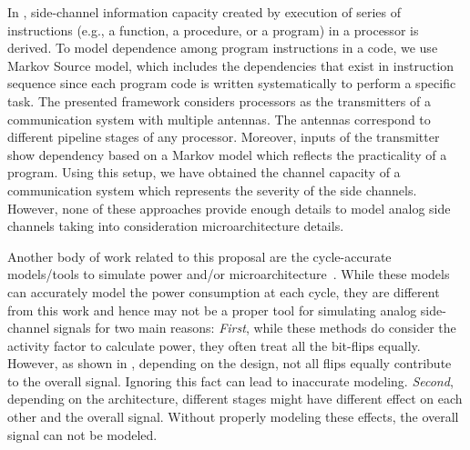 \documentclass[11 pt]{article}
\begin{document}
In \cite{Baki_2020a}, side-channel information capacity created by execution of series of instructions (e.g., a function, a procedure, or a program) in a processor is derived. To model dependence among program instructions in a code, we use Markov Source model, which includes the dependencies that exist in instruction sequence since each program code is written systematically to perform a specific task. The presented  framework  considers processors as the transmitters of a communication system with multiple antennas. The antennas correspond to different pipeline stages of any processor. Moreover, inputs of the transmitter show dependency based on a Markov model which reflects the practicality of a program. Using this setup, we have obtained the channel capacity of a communication system which represents the severity of the side channels. However, none of these approaches provide enough details to model analog side channels taking into consideration microarchitecture details.

Another body of work related to this proposal are the cycle-accurate models/tools to simulate power and/or microarchitecture~\cite{Li:2009:MIP:1669112.1669172,Li:2011:CAM:2132325.2132479,509850,Ardestani:2013:EFM:2495252.2495480,Binkert:2011:GS:2024716.2024718,sesc,5982026,carlson2014aeohmcm}. While these models can accurately model the power consumption at each cycle, they are different from this work and hence may not be a proper tool for simulating analog side-channel signals for two main reasons: \textit{First}, while these methods do consider the activity factor to calculate power, they often treat all the bit-flips equally. However, as shown in \cite{Nader2020}, depending on the design, not all flips equally contribute to the overall signal. Ignoring this fact can lead to inaccurate modeling. \textit{Second}, depending on the architecture, different stages might have different effect on each other and the overall signal. Without properly modeling these effects, the overall signal can not be modeled.
\end{document}
